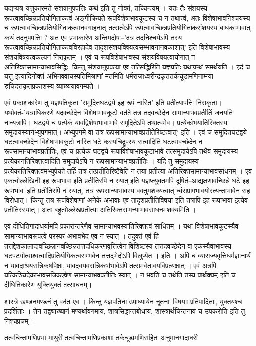 यद्यप्यत्र यत्तुकारमते संशयानुपपत्तिः कथं इति तु नोक्तं, तच्चिन्त्यम् । यतः तैः संशयस्य रूपत्वावच्छिन्नप्रतियोगिताकत्वं अङ्गीक्रियते  रूपविशेषाभावकूटस्य च न तथात्वं, अतः विशेषाभावनिश्चयस्य च रूपत्वावच्छिन्नप्रतियोगिताकत्वानवगाहनात् तत्सत्वेऽपि रूपत्वावच्छिन्नप्रतियोगिताकसंशयस्य बाधकाभावात् कथं तदनुपपत्तिः ? अत एव प्रभाकारेण अन्तिमदोषः--’तत्र तदनिश्चयेऽपि तस्य रूपत्वावच्छिन्नप्रतियोगिताकत्वविरहादेव तादृशसंशयविषयत्वसम्भावनानवकाशात्’ इति विशेषाभावस्य संशयविषयत्वकल्पनं निराकृतम् । एवं च रूपविशेषाभावस्य संशयविषयत्वायोगात् न अतिरिक्तसामान्याभावसिद्धिः, किन्तु संशयानुपपत्या एव तत्सिद्धिरिति यज्ञपतिः यथाग्रन्थं समर्थयति । इदं च यत्तु इत्यादिनोक्तं अभिनववाचस्पतिमिश्राणां मतमिति धर्मराजाध्वरीन्द्रकृततर्कचूडामणिनाम्न्या रुचिदत्तकृतप्रकाशस्य व्याख्ययावगम्यते ।

एवं प्रकाशकारेण तु यज्ञपतिकृता ’समुदितघटद्वये इह रूपं नास्ति’ इति प्रतीत्यापत्तिः निराकृता। यथोक्तं-’यत्राधिकरणे यदवच्छेदेन विशेषाभावकूटो वर्तते तत्र तदवच्छेदेन सामान्याभवप्रतीतिं जनयति नान्यत्रापि। घटद्वये च प्रत्येकं यावद्विशेषाभावाभावे समुदितेऽपि तथात्वमेव। प्रत्येकोभयातिरिक्तस्य समुदायस्यानभ्युपगमात्। अभ्युपगमे वा तत्र रूपसामान्याभावप्रतीतेरिष्टत्वात्’ इति । एवं च समुदितघटद्वये घटत्वावच्छेदेन विशेषाभावकूटो नास्ति धटे कस्यचिद्रूपस्य सत्वादिति घटत्वावच्छेदेन न रूपसामान्याभावप्रतीतिः, एवं च प्रत्येकं घटद्वये रूपाविशेषाभावकूटाभावे तत्समुदायेऽपि तथैव समुदायस्य प्रत्येकानतिरिक्तत्वादिति समुदायेऽपि न रूपसामान्याभावप्रतीतिः । यदि तु  समुदायस्य प्रत्येकातिरिक्तत्वमभ्युपेयते तर्हि तत्र तत्प्रतीतिरिष्टैवेति न तया प्रतीत्या अतिरिक्तसामान्याभावसाधनम् । एवं एकत्वोल्लेखिनी इह रूपाभावः इति प्रतीतिरपि न स्यात् इति यज्ञप्त्युक्तमपि दूषितं–आद्यक्षणावच्छिन्ने घटे इह रूपाभावः इति प्रतीतिरपि न स्यात्, तत्र रूपसान्याभावस्य वक्तुमशक्यत्वात् ध्वंसप्रागभावयोरत्यन्ताभावेन सह विरोधात्। किन्तु तत्र रूपविशेषाणां अनेके  अभावाः एव तादृशप्रतीतिविषया इति तत्रापि इह रूपाभावा इत्येव प्रतीतिस्स्यात्। अतः बहुत्वोल्लेखप्रतीत्या अतिरिक्तसामन्याभावसाधनमशक्यमिति ।

एवं दीधितिगादाधर्यामपि प्रकारान्तरेणैव सामान्याभवस्यातिरिक्तत्वं साधितम् । यथा विशेषाभावकूटस्यैव सामान्याभावरूपत्वे परस्परं अभावभेद एव न स्यात् । तदुक्तं-एवं हि तत्तद्देशकालाद्यवच्छिन्नानवच्छिन्नतत्तदधिकरणवृत्तित्वेन विशिष्टस्य तत्तदवच्छेदेन वा एकस्यैवाभावस्य घटपटगोत्वाश्वत्वादिप्रतियोगिकत्वसम्भवेन तत्तद्भेदोऽपि विलुप्येत । इति । अपि च व्यासज्यवृत्तिधर्मज्ञानार्थं न यावदाश्रयसन्निकर्षापेक्षा, यावदवयवसन्निकर्षाभावेऽपि तत्समवेतावयविप्रत्यक्षात् । एवं अत्रपि यत्किञ्चिदेकाभावसन्निकएषेण सामान्याभवप्रतीतिः स्यात् । न भवति च तथेति तस्य पार्थक्यम् इति च दीधितिकारेण युक्तियुक्तं तत्साधनम्।

शास्त्रे खण्डनमण्डनं तु वर्तत एव । किन्तु यज्ञपतिना उपाध्यायेन नूतनाः विषयाः प्रतिपादिताः, युक्तयश्च  प्रदर्शिताः । तेन तद्व्याख्यानं मण्यर्थावगमाय, शात्रसिद्धान्तबोधाय, शास्त्रार्थचिन्तनाय च उपकरोति इति तु निश्चप्रचम् ।

\begin{thebibliography}{99}
 तत्वचिन्तामणिप्रभा 
 माथुरी 
 तत्वचिन्तामणिप्रकाशः तर्कचूडामणिसहितः
 अनुमानगादाधरी
\end{thebibliography}
